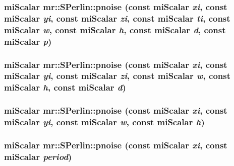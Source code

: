 \subsubsection{\setlength{\rightskip}{0pt plus 5cm}mi\-Scalar mr::SPerlin::pnoise (const mi\-Scalar {\em xi}, const mi\-Scalar {\em yi}, const mi\-Scalar {\em zi}, const mi\-Scalar {\em ti}, const mi\-Scalar {\em w}, const mi\-Scalar {\em h}, const mi\-Scalar {\em d}, const mi\-Scalar {\em p})\hspace{0.3cm}{\tt  [inline, static]}}\label{classmr_1_1SPerlin_e17}


\subsubsection{\setlength{\rightskip}{0pt plus 5cm}mi\-Scalar mr::SPerlin::pnoise (const mi\-Scalar {\em xi}, const mi\-Scalar {\em yi}, const mi\-Scalar {\em zi}, const mi\-Scalar {\em w}, const mi\-Scalar {\em h}, const mi\-Scalar {\em d})\hspace{0.3cm}{\tt  [inline, static]}}\label{classmr_1_1SPerlin_e16}


\subsubsection{\setlength{\rightskip}{0pt plus 5cm}mi\-Scalar mr::SPerlin::pnoise (const mi\-Scalar {\em xi}, const mi\-Scalar {\em yi}, const mi\-Scalar {\em w}, const mi\-Scalar {\em h})\hspace{0.3cm}{\tt  [inline, static]}}\label{classmr_1_1SPerlin_e15}


\subsubsection{\setlength{\rightskip}{0pt plus 5cm}mi\-Scalar mr::SPerlin::pnoise (const mi\-Scalar {\em xi}, const mi\-Scalar {\em period})\hspace{0.3cm}{\tt  [inline, static]}}\label{classmr_1_1SPerlin_e14}



